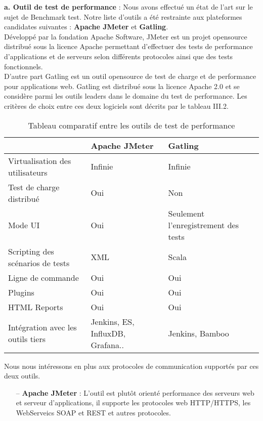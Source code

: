 \begin{spacing}{1.2}
\textbf{a.  Outil de test de performance} : Nous avons effectué un état de l'art sur le sujet de Benchmark test. Notre liste d'outils  a été restrainte aux plateformes candidates suivantes : \textbf{Apache JMeter} et \textbf{Gatling}. \\
Développé par la fondation Apache Software, JMeter est un projet opensource distribué sous la licence Apache permettant d'effectuer des tests de performance d'applications et de serveurs selon différents protocoles ainsi que des tests fonctionnels. \\
D'autre part Gatling est un outil opensource de test de charge et de performance pour applications web. Gatling est distribué sous la licence Apache 2.0 et se considère parmi les outils leaders dans le domaine du test de performance.
Les critères de choix entre ces deux logiciels sont décrits par le tableau III.2.
\begin{table}[ht]
	\centering
	\caption{Tableau comparatif entre les outils de test de performance}
	\footnotesize
	\begin{tabularx}{\textwidth}{|X|X|X|}
          \hline & {\textbf{Apache JMeter}} & {\textbf{Gatling}} \\
          \hline
          Virtualisation des utilisateurs  & Infinie & Infinie  \\
          \hline
          Test de charge distribué & Oui & Non  
          \\
          \hline
          Mode UI & Oui & Seulement l'enregistrement des tests  \\
          \hline
          Scripting des scénarios de tests & XML & Scala \\
          \hline 
          Ligne de commande & Oui & Oui \\
          \hline
          Plugins & Oui & Oui \\
          \hline
          HTML Reports & Oui & Oui \\
          \hline
          Intégration avec les outils tiers & Jenkins, ES, InfluxDB, Grafana.. & Jenkins, Bamboo\\
          \hline
        \end{tabularx}
	\label{tab:exple}
\end{table} 
\FloatBarrier
Nous nous intéressons en plus aux protocoles de communication supportés par ces deux outils.
\begin{itemize}
    \setlength\itemsep{0em}
    \item[--] \textbf{Apache JMeter} : L'outil est plutôt orienté performance des serveurs web et serveur d'applications, il supporte les protocoles web HTTP/HTTPS, les WebServeics SOAP et REST et autres protocoles.

\end{itemize}
\end{spacing}
